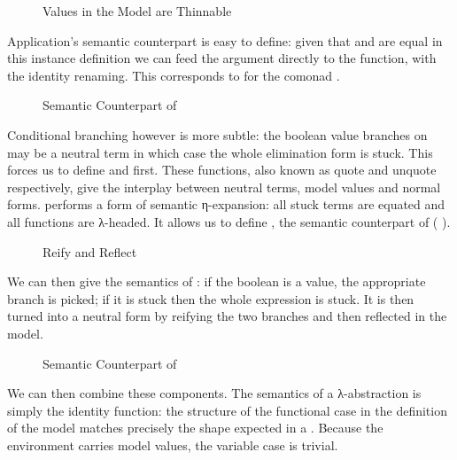 \begin{figure}[h]
\caption{Values in the Model are Thinnable\label{fig:thnbemodel}}
\end{figure}

Application's semantic counterpart is easy to define: given that 
and  are equal in this instance definition we can feed the argument
directly to the function, with the identity renaming. This corresponds to
 for the comonad .

\begin{figure}[h]
\caption{Semantic Counterpart of \label{fig:nbeapp}}
\end{figure}

Conditional branching however is more subtle: the boolean value  branches on
may be a neutral term in which case the whole elimination form is stuck. This forces
us to define  and  first. These functions, also known as quote
and unquote respectively, give the interplay between neutral terms, model values and
normal forms.  performs a form of semantic η-expansion: all stuck 
terms are equated and all functions are λ-headed. It allows us to define , the
semantic counterpart of ( ).

\begin{figure}[h]
\caption{Reify and Reflect\label{fig:reifyreflectnbe}}
\end{figure}

We can then give the semantics of : if the boolean is a value, the
appropriate branch is picked; if it is stuck then the whole expression is stuck.
It is then turned into a neutral form by reifying the two branches and then reflected
in the model.

\begin{figure}[h]
\caption{Semantic Counterpart of \label{fig:nbeifte}}
\end{figure}

We can then combine these components. The semantics of a λ-abstraction is simply the
identity function: the structure of the functional case in the definition of the model
matches precisely the shape expected in a . Because the environment
carries model values, the variable case is trivial.

